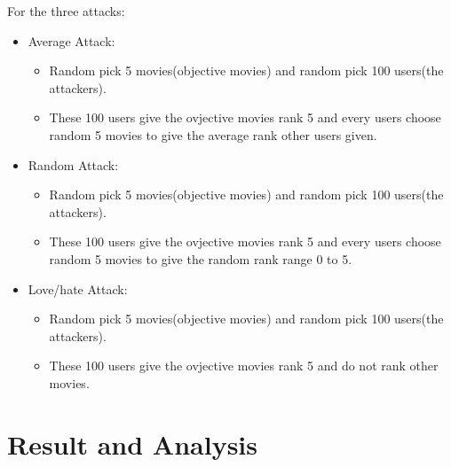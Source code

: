 \documentclass[a4paper, 12pt]{article}
\theoremstyle{definition}
\begin{document}
For the three attacks:
\begin{itemize}
	\item Average Attack:\\
	 \begin{itemize}
	 	\item Random pick 5 movies(objective movies) and random pick 100 users(the attackers).
	 	\item These 100 users give the ovjective movies rank 5 and every users choose random 5 movies to give the average rank other users given.
	 \end{itemize}
 	\item Random Attack:\\
 \begin{itemize}
 	\item Random pick 5 movies(objective movies) and random pick 100 users(the attackers).
 	\item These 100 users give the ovjective movies rank 5 and every users choose random 5 movies to give the random rank range 0 to 5.
 \end{itemize}
\item Love/hate Attack:\\
\begin{itemize}
	\item Random pick 5 movies(objective movies) and random pick 100 users(the attackers).
	\item These 100 users give the ovjective movies rank 5 and do not rank other movies.
\end{itemize}
\end{itemize}
\section{Result and Analysis}
\end{document}
